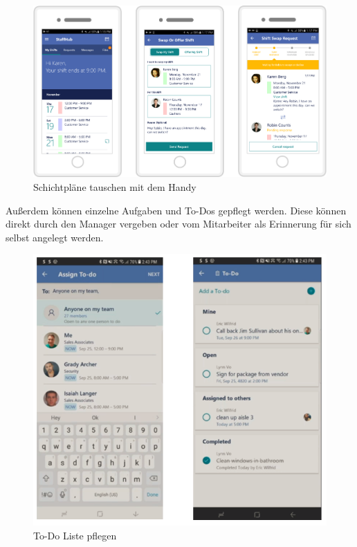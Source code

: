 \begin{figure}[H] 
\centering 
\includegraphics[scale=0.48]{images/schedulemobile} 
\caption[Schichtpläne tauschen mit dem Handy]{Schichtpläne tauschen mit dem Handy\protect} 
\label{ws} 
\end{figure}

Außerdem können einzelne Aufgaben und To-Dos gepflegt werden. Diese können direkt durch den Manager vergeben oder vom Mitarbeiter als Erinnerung für sich selbst angelegt werden. 

\begin{figure}[H] 
\centering 
\includegraphics[scale=0.78]{images/todolist} 
\caption[To-Do Liste pflegen]{To-Do Liste pflegen\protect} 
\label{ws} 
\end{figure}

